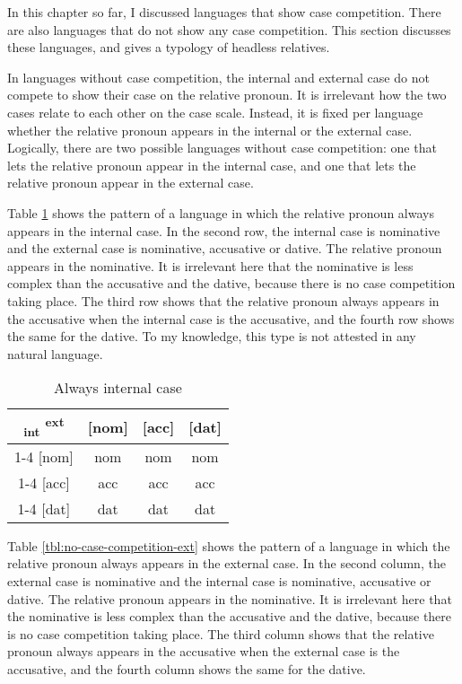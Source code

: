 In this chapter so far, I discussed languages that show case competition. There are also languages that do not show any case competition. This section discusses these languages, and gives a typology of headless relatives.

In languages without case competition, the internal and external case do not compete to show their case on the relative pronoun. It is irrelevant how the two cases relate to each other on the case scale. Instead, it is fixed per language whether the relative pronoun appears in the internal or the external case. Logically, there are two possible languages without case competition: one that lets the relative pronoun appear in the internal case, and one that lets the relative pronoun appear in the external case.

Table \ref{tbl:no-case-competition-int} shows the pattern of a language in which the relative pronoun always appears in the internal case. In the second row, the internal case is nominative and the external case is nominative, accusative or dative. The relative pronoun appears in the nominative. It is irrelevant here that the nominative is less complex than the accusative and the dative, because there is no case competition taking place. The third row shows that the relative pronoun always appears in the accusative when the internal case is the accusative, and the fourth row shows the same for the dative. To my knowledge, this type is not attested in any natural language.

\begin{table}[H]
  \center
  \caption{Always internal case}
  \begin{tabular}{c|c|c|c}
    \toprule
   \textsubscript{\ac{int}} \textsuperscript{\ac{ext}}
          & [\ac{nom}]
          & [\ac{acc}]
          & [\ac{dat}]
          \\ \cmidrule{1-4}
      [\ac{nom}]
          & \ac{nom}
          & \ac{nom}
          & \ac{nom}
          \\ \cmidrule{1-4}
      [\ac{acc}]
          & \ac{acc}
          & \ac{acc}
          & \ac{acc}
          \\ \cmidrule{1-4}
      [\ac{dat}]
          & \ac{dat}
          & \ac{dat}
          & \ac{dat}
          \\
    \bottomrule
  \end{tabular}
  \label{tbl:no-case-competition-int}
\end{table}

Table \ref{tbl:no-case-competition-ext} shows the pattern of a language in which the relative pronoun always appears in the external case. In the second column, the external case is nominative and the internal case is nominative, accusative or dative. The relative pronoun appears in the nominative. It is irrelevant here that the nominative is less complex than the accusative and the dative, because there is no case competition taking place. The third column shows that the relative pronoun always appears in the accusative when the external case is the accusative, and the fourth column shows the same for the dative.

